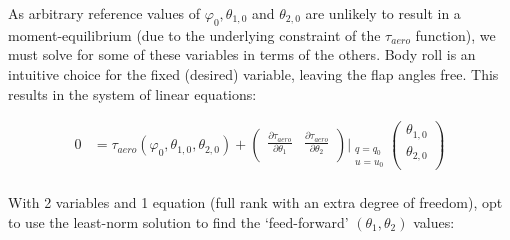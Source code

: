 \documentclass[12pt]{article}
\begin{document}
As arbitrary reference values of $\varphi_0, \theta_{1, 0}$ and $\theta_{2, 0}$ are unlikely to result in a moment-equilibrium (due to the underlying constraint of the $\tau_{aero}$ function), we must solve for some of these variables in terms of the others.  Body roll is an intuitive choice for the fixed (desired) variable, leaving the flap angles free.  This results in the system of linear equations:

\begin{align*}
0 &= \tau_{aero}(\varphi_0, \theta_{1, 0}, \theta_{2, 0}) + \begin{pmatrix}
\frac{\partial \tau_{aero}}{\partial \theta_1} & \frac{\partial \tau_{aero}}{\partial \theta_2} \\
\end{pmatrix}\Big|_{\substack{q = q_0\\u = u_0}}
\begin{pmatrix}
\theta_{1, 0} \\
\theta_{2, 0} \\
\end{pmatrix} \\
\end{align*}

With 2 variables and 1 equation (full rank with an extra degree of freedom), opt to use the least-norm solution to find the `feed-forward' $(\theta_1, \theta_2)$ values:
\end{document}
